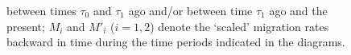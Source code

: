 \documentclass[11pt]{article}
\begin{document}
\begin{figure}[!bth]
{%
between times $\tau_0$ and $\tau_1$ ago and/or 
between time $\tau_1$ ago and the present; $M_i$ and $M'_i$ ($i=1,2$) denote the `scaled' migration rates backward in time during the time periods indicated in the diagrams. 
}
\label{models}
\end{figure}
\end{document}
